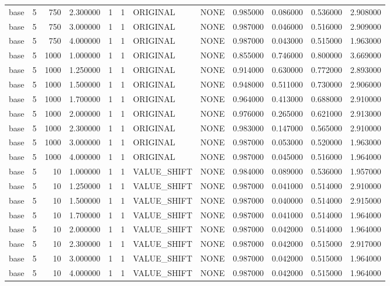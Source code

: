 \begin{tabular}{lrrrllllrrrr}
base & 5 & 750 & 2.300000 & 1 & 1 & ORIGINAL & NONE & 0.985000 & 0.086000 & 0.536000 & 2.908000 \\
base & 5 & 750 & 3.000000 & 1 & 1 & ORIGINAL & NONE & 0.987000 & 0.046000 & 0.516000 & 2.909000 \\
base & 5 & 750 & 4.000000 & 1 & 1 & ORIGINAL & NONE & 0.987000 & 0.043000 & 0.515000 & 1.963000 \\
base & 5 & 1000 & 1.000000 & 1 & 1 & ORIGINAL & NONE & 0.855000 & 0.746000 & 0.800000 & 3.669000 \\
base & 5 & 1000 & 1.250000 & 1 & 1 & ORIGINAL & NONE & 0.914000 & 0.630000 & 0.772000 & 2.893000 \\
base & 5 & 1000 & 1.500000 & 1 & 1 & ORIGINAL & NONE & 0.948000 & 0.511000 & 0.730000 & 2.906000 \\
base & 5 & 1000 & 1.700000 & 1 & 1 & ORIGINAL & NONE & 0.964000 & 0.413000 & 0.688000 & 2.910000 \\
base & 5 & 1000 & 2.000000 & 1 & 1 & ORIGINAL & NONE & 0.976000 & 0.265000 & 0.621000 & 2.913000 \\
base & 5 & 1000 & 2.300000 & 1 & 1 & ORIGINAL & NONE & 0.983000 & 0.147000 & 0.565000 & 2.910000 \\
base & 5 & 1000 & 3.000000 & 1 & 1 & ORIGINAL & NONE & 0.987000 & 0.053000 & 0.520000 & 1.963000 \\
base & 5 & 1000 & 4.000000 & 1 & 1 & ORIGINAL & NONE & 0.987000 & 0.045000 & 0.516000 & 1.964000 \\
base & 5 & 10 & 1.000000 & 1 & 1 & VALUE_SHIFT & NONE & 0.984000 & 0.089000 & 0.536000 & 1.957000 \\
base & 5 & 10 & 1.250000 & 1 & 1 & VALUE_SHIFT & NONE & 0.987000 & 0.041000 & 0.514000 & 2.910000 \\
base & 5 & 10 & 1.500000 & 1 & 1 & VALUE_SHIFT & NONE & 0.987000 & 0.040000 & 0.514000 & 2.915000 \\
base & 5 & 10 & 1.700000 & 1 & 1 & VALUE_SHIFT & NONE & 0.987000 & 0.041000 & 0.514000 & 1.964000 \\
base & 5 & 10 & 2.000000 & 1 & 1 & VALUE_SHIFT & NONE & 0.987000 & 0.042000 & 0.514000 & 1.964000 \\
base & 5 & 10 & 2.300000 & 1 & 1 & VALUE_SHIFT & NONE & 0.987000 & 0.042000 & 0.515000 & 2.917000 \\
base & 5 & 10 & 3.000000 & 1 & 1 & VALUE_SHIFT & NONE & 0.987000 & 0.042000 & 0.515000 & 1.964000 \\
base & 5 & 10 & 4.000000 & 1 & 1 & VALUE_SHIFT & NONE & 0.987000 & 0.042000 & 0.515000 & 1.964000 \\

\end{tabular}
